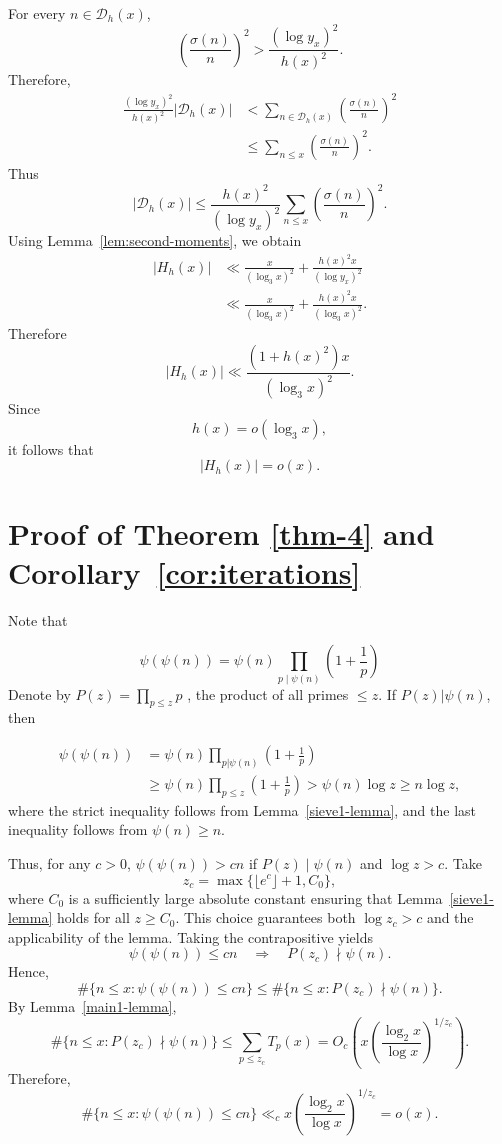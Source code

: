 \documentclass{article}
\theoremstyle{remark}
\begin{document}
For every \(n\in\mathcal D_h(x)\),
\[
        \left(\frac{\sigma(n)}n\right)^2
        >
        \frac{(\log y_x)^2}{h(x)^2}.
\]
Therefore,
\[
\begin{aligned}
 \frac{(\log y_x)^2}{h(x)^2}
 |\mathcal D_h(x)|
 &<
 \sum_{n\in\mathcal D_h(x)}
 \left(\frac{\sigma(n)}n\right)^2\\
 &\leq
 \sum_{n\le x}
 \left(\frac{\sigma(n)}n\right)^2.
\end{aligned}
\]
Thus
\[
        |\mathcal D_h(x)|
        \leq
        \frac{h(x)^2}{(\log y_x)^2}
        \sum_{n\le x}
        \left(\frac{\sigma(n)}n\right)^2.
\]
Using Lemma~\ref{lem:second-moments}, we obtain
\[
\begin{aligned}
 |H_h(x)|
 &\ll
 \frac{x}{(\log_3x)^2}
 +
 \frac{h(x)^2x}{(\log y_x)^2}\\
 &\ll
 \frac{x}{(\log_3x)^2}
 +
 \frac{h(x)^2x}{(\log_3x)^2}.
\end{aligned}
\]
Therefore
\[
        |H_h(x)|
        \ll
        \frac{(1+h(x)^2)x}{(\log_3x)^2}.
\]
Since
\[
        h(x)=o(\log_3x),
\]
it follows that
\[
        |H_h(x)|=o(x).
\]



\section{\textbf{Proof of Theorem \ref{thm-4} }and Corollary~\ref{cor:iterations}}
\medskip

Note that

\begin{equation*}               \psi\left(\psi\left(n\right)\right)=\psi\left(n\right)\prod_{p \mid \psi\left(n\right)} \left(1 + \frac{1}{p}\right)
\end{equation*}
Denote by $P(z)= \prod\limits_{p\leq z} p$ , the product of all primes $\leq z$. If $P(z) | \psi(n)$, then

\begin{align*}
      \psi(\psi(n)) &= \psi(n) \prod_{p|\psi(n)} \left(1+\frac{1}{p}\right)\\
      &\geq \psi(n) \prod_{p\leq z} \left(1+ \frac{1}{p}\right)  > \psi(n)\log z \geq n\log z ,
\end{align*}
where the strict inequality follows from Lemma~\ref{sieve1-lemma},
and the last inequality follows from \(\psi(n)\ge n\).


Thus, for any $c>0$, $\psi(\psi(n))> cn$ if $P(z)\mid\psi(n)$ and $\log z > c$. Take
\[
z_c=\max\{\lfloor e^c\rfloor+1,C_0\},
\]
where $C_0$ is a sufficiently large absolute constant ensuring that
Lemma~\ref{sieve1-lemma} holds for all $z\ge C_0$. This choice
guarantees both $\log z_c>c$ and the applicability of the lemma.
Taking the contrapositive yields
\[
\psi(\psi(n))\le cn \quad\Longrightarrow\quad P(z_c)\nmid\psi(n).
\]
Hence,
\[
\#\{n\le x:\psi(\psi(n))\le cn\}
\le
\#\{n\le x:P(z_c)\nmid\psi(n)\}.
\]
By Lemma~\ref{main1-lemma},
\[
\#\{n\le x:P(z_c)\nmid\psi(n)\}
\le
\sum_{p\le z_c}T_p(x)
=
O_c\left(
x\left(\frac{\log_2 x}{\log x}\right)^{1/z_c}
\right).
\]
Therefore,
\[
\#\{n\le x:\psi(\psi(n))\le cn\}
\ll_c
x\left(\frac{\log_2 x}{\log x}\right)^{1/z_c}
=o(x).
\]
\end{document}
